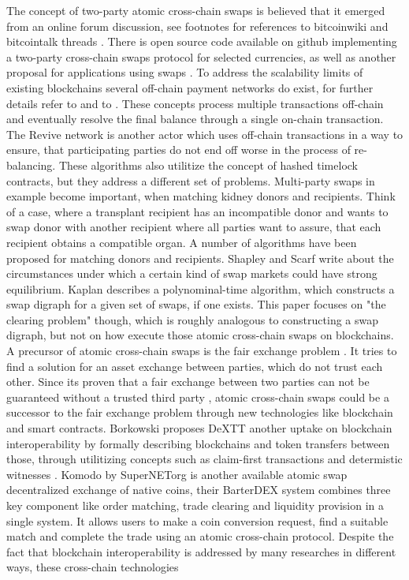 The concept of two-party atomic cross-chain swaps is believed that it emerged from an online forum discussion, see footnotes for references to bitcoinwiki and bitcointalk threads \cite{atomictrading} \cite{cutandchoose}. There is open source code available on github \cite{hashedtimelocked} \cite{dered} implementing a two-party cross-chain swaps protocol for selected currencies, as well as another proposal for applications using swaps \cite{zyskind2018enigma}. To address the scalability limits of existing blockchains several off-chain payment networks do exist, for further details refer to \cite{raidennetwork} and to \cite{poon2016bitcoin} \cite{decker2015fast} \cite{green2017bolt}. These concepts process multiple transactions off-chain and eventually resolve the final balance through a single on-chain transaction. The Revive network \cite{khalil2017revive} is another actor which uses off-chain transactions in a way to ensure, that participating parties do not end off worse in the process of re-balancing. These algorithms also utilitize the concept of hashed timelock contracts, but they address a different set of problems. Multi-party swaps in example become important, when matching kidney donors and recipients. Think of a case, where a transplant recipient has an incompatible donor and wants to swap donor with another recipient where all parties want to assure, that each recipient obtains a compatible organ. A number of algorithms \cite{abraham2007clearing} \cite{dickerson2016position} \cite{jia2017efficient} have been proposed for matching donors and recipients. Shapley and Scarf \cite{shapley1974cores} write about the circumstances under which a certain kind of swap markets could have strong equilibrium. Kaplan \cite{kaplan2011improved} describes a polynominal-time algorithm, which constructs a swap digraph for a given set of swaps, if one exists. This paper focuses on "the clearing problem" though, which is roughly analogous to constructing a swap digraph, but not on how execute those atomic cross-chain swaps on blockchains. A precursor of atomic cross-chain swaps is the fair exchange problem \cite{franklin1998secure} \cite{micali2003simple}. It tries to find a solution for an asset exchange between parties, which do not trust each other. Since its proven that a fair exchange between two parties can not be guaranteed without a trusted third party \cite{pagnia1999impossibility}, atomic cross-chain swaps could be a successor to the fair exchange problem through new technologies like blockchain and smart contracts. Borkowski proposes \ac{DeXTT} another uptake on blockchain interoperability by formally describing blockchains and token transfers between those, through utilitizing concepts such as claim-first transactions and determistic witnesses \cite{borkowski2019dextt}. Komodo \cite{barterdex2020} by SuperNETorg is another available atomic swap decentralized exchange of native coins, their BarterDEX system combines three key component like order matching, trade clearing and liquidity provision in a single system. It allows users to make a coin conversion request, find a suitable match and complete the trade using an atomic cross-chain protocol. Despite the fact that blockchain interoperability is addressed by many researches in different ways, these cross-chain technologies 